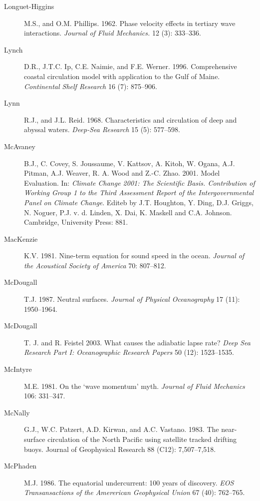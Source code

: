 \begin{description}
\item [Longuet-Higgins]M.S., and O.M. Phillips. 1962. Phase velocity effects in tertiary wave interactions. \textit{Journal of Fluid Mechanics.} 12 (3): 333--336.

\item [Lynch]D.R., J.T.C. Ip, C.E. Naimie, and F.E. Werner. 1996. Comprehensive
coastal circulation model with application to the Gulf of Maine.
\textit{Continental Shelf Research} 16 (7): 875--906.

\item [Lynn]R.J., and J.L. Reid. 1968. Characteristics and circulation of deep
and abyssal waters. \textit{Deep-Sea Research} 15 (5): 577--598.

\item [McAvaney]B.J., C. Covey, S. Joussaume, V. Kattsov, A. Kitoh, W. Ogana,
A.J. Pitman, A.J. Weaver, R. A. Wood and Z.-C. Zhao. 2001. Model Evaluation. In:
\textit{Climate Change 2001: The Scientific Basis. Contribution of Working Group 1
to the Third Assessment Report of the Intergovernmental Panel on Climate Change}.
Editeb by J.T. Houghton, Y. Ding, D.J. Griggs, N. Noguer, P.J. v. d. Linden, X.
Dai, K. Maskell and C.A. Johnson. Cambridge, University Press: 881.

\item [MacKenzie]K.V. 1981. Nine-term equation for sound speed in the ocean.
\textit{Journal of the Acoustical Society of America} 70: 807--812.

\item [McDougall]T.J. 1987. Neutral surfaces. \textit{Journal of Physical Oceanography} 17 (11): 1950--1964.

\item [McDougall]T. J. and R. Feistel 2003. What causes the adiabatic lapse rate? \textit{Deep Sea Research Part I: Oceanographic Research Papers} 50 (12): 1523--1535.

\item [McIntyre]M.E. 1981. On the `wave momentum' myth. \textit{Journal of Fluid Mechanics} 106: 331--347.

\item [McNally]G.J., W.C. Patzert, A.D. Kirwan, and A.C. Vastano. 1983. The
near-surface circulation of the North Pacific using satellite tracked drifting
buoys. Journal of Geophysical Research 88 (C12): 7,507--7,518.

\item [McPhaden]M.J. 1986. The equatorial undercurrent: 100 years of discovery. \textit{EOS Transansactions of the Amererican Geophysical Union} 67 (40): 762--765.


\end{description}
